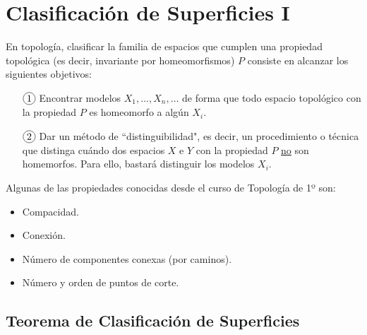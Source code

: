 \documentclass[GTSResumen.tex]{subfiles}
\begin{document}

\renewcommand\chaptername{\Huge Tema}

\titleformat{\chapter}[display]
    {\normalfont\huge\bfseries}{\chaptertitlename\ \thechapter}{10pt}{\Huge}
\titlespacing*{\chapter}{0pt}{-1cm}{10pt}

  

\setcounter{chapter}{1}

\chapter{Clasificación de Superficies I}
En topología, clasificar la familia de espacios que cumplen una propiedad topológica (es decir, invariante por homeomorfismos) $P$ consiste en alcanzar los siguientes objetivos:
\begin{enumerate}
\item[$\circled{1}$] Encontrar modelos $X_1,\dots,X_n,\dots$ de forma que todo espacio topológico con la propiedad $P$ es homeomorfo a algún $X_i$.
\item[$\circled{2}$] Dar un método de ``distinguibilidad", es decir, un procedimiento o técnica que distinga cuándo dos espacios $X$ e $Y$ con la propiedad $P$ \underline{no} son homemorfos. Para ello, bastará distinguir los modelos $X_i$.
\end{enumerate}
Algunas de las propiedades conocidas desde el curso de Topología de 1º son:
\begin{itemize}
\item Compacidad.
\item Conexión.
\item Número de componentes conexas (por caminos).
\item Número y orden de puntos de corte.
\end{itemize}


\section{Teorema de Clasificación de Superficies}
\end{document}
